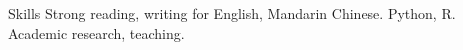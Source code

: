 
\begin{rubric}{Skills}
\entry*[Languages]
	Strong reading, writing for English, Mandarin Chinese.
	Python, R.
\entry*[Misc.]
	Academic research, teaching.
\end{rubric}
